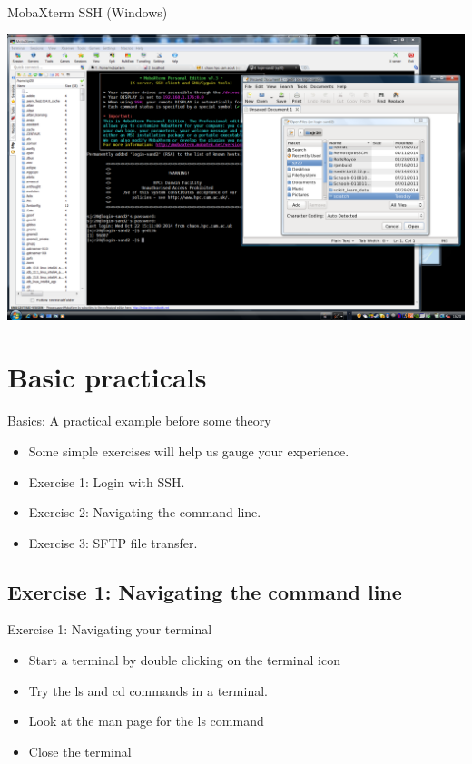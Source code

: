 \begin{frame}{MobaXterm SSH (Windows)}
\begin{center}
\centerline{\includegraphics[height=0.8\textheight]{imgs/mobaxterm-SSH-session.png}}
\end{center}
\end{frame}

\section{Basic practicals}
\begin{frame}{Basics: A practical example before some theory}
\begin{itemize}
\item{Some simple exercises will help us gauge your experience.}
\item{Exercise 1: Login with SSH.}
\item{Exercise 2: Navigating the command line.}
\item{Exercise 3: SFTP file transfer.}
\end{itemize}
\end{frame}

\subsection{Exercise 1: Navigating the command line}
\begin{frame}{Exercise 1: Navigating your terminal}
\begin{itemize}
\item{Start a terminal by double clicking on the terminal icon}
\item{Try the \alert{\footnotesize ls } and \alert{\footnotesize cd } commands in a terminal.}
\item{Look at the man page for the ls command}
\item{Close the terminal}
\end{itemize}
\end{frame}

